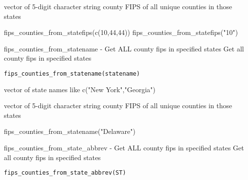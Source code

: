 \documentclass[a4paper]{book}
\begin{document}
%
\begin{Value}
vector of 5-digit character string county FIPS of all unique counties in those states
\end{Value}
%
\begin{Examples}
\begin{ExampleCode}
  fips_counties_from_statefips(c(10,44,44))
  fips_counties_from_statefips("10")
\end{ExampleCode}
\end{Examples}
%
\begin{Description}\relax
fips\_counties\_from\_statename - Get ALL county fips in specified states
Get all county fips in specified states
\end{Description}
%
\begin{Usage}
\begin{verbatim}
fips_counties_from_statename(statename)
\end{verbatim}
\end{Usage}
%
\begin{Arguments}
\begin{ldescription}
\item[\code{statename}] vector of state names like c("New York","Georgia")
\end{ldescription}
\end{Arguments}
%
\begin{Value}
vector of 5-digit character string county FIPS of all unique counties in those states
\end{Value}
%
\begin{Examples}
\begin{ExampleCode}
fips_counties_from_statename("Delaware")
\end{ExampleCode}
\end{Examples}
%
\begin{Description}\relax
fips\_counties\_from\_state\_abbrev - Get ALL county fips in specified states
Get all county fips in specified states
\end{Description}
%
\begin{Usage}
\begin{verbatim}
fips_counties_from_state_abbrev(ST)
\end{verbatim}
\end{Usage}
\end{document}

